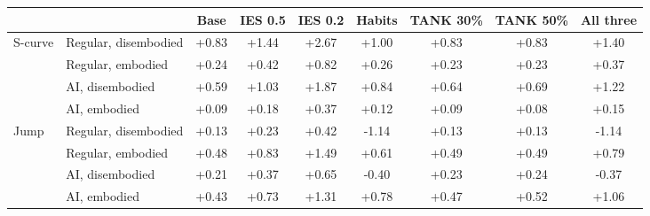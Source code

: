 \begin{tabular}{llccccccc}\toprule
 & & Base & IES 0.5 & IES 0.2 & Habits & TANK 30\% & TANK 50\% & All three\\\midrule
S-curve & Regular, disembodied & +0.83 & +1.44 & +2.67 & +1.00 & +0.83 & +0.83 & +1.40\\
 & Regular, embodied & +0.24 & +0.42 & +0.82 & +0.26 & +0.23 & +0.23 & +0.37\\
 & AI, disembodied & +0.59 & +1.03 & +1.87 & +0.84 & +0.64 & +0.69 & +1.22\\
 & AI, embodied & +0.09 & +0.18 & +0.37 & +0.12 & +0.09 & +0.08 & +0.15\\
\midrule
Jump & Regular, disembodied & +0.13 & +0.23 & +0.42 & -1.14 & +0.13 & +0.13 & -1.14\\
 & Regular, embodied & +0.48 & +0.83 & +1.49 & +0.61 & +0.49 & +0.49 & +0.79\\
 & AI, disembodied & +0.21 & +0.37 & +0.65 & -0.40 & +0.23 & +0.24 & -0.37\\
 & AI, embodied & +0.43 & +0.73 & +1.31 & +0.78 & +0.47 & +0.52 & +1.06\\
\bottomrule\end{tabular}
